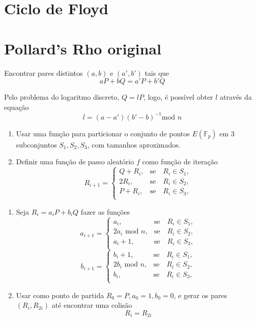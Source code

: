 \documentclass{beamer}
\newcounter{saveenumi}
\newcommand{\seti}{\setcounter{saveenumi}{\value{enumi}}}
\newcommand{\conti}{\setcounter{enumi}{\value{saveenumi}}}
\begin{document}
\section{Ciclo de Floyd}
\begin{frame}

\end{frame}

%
%
\section{Pollard's Rho original}
\begin{frame}
Encontrar pares distintos $(a,b)$ e $(a',b')$ tais que
$$aP + bQ = a'P + b'Q$$

Pelo problema do logaritmo discreto, $Q = lP$, logo, é possível obter $l$ através da equação
$$l = (a - a')(b' - b)^{-1} \mbox{mod }n$$
\end{frame}

\begin{frame}
\begin{enumerate}
\item Usar uma função para particionar o conjunto de pontos $E(\mathbb{F}_p)$ em 3 subconjuntos $S_1, S_2, S_3$, com tamanhos aproximados.
\item Definir uma função de passo aleatório $f$ como função de iteração
$$
R_{i+1}=\left\{\begin{array}{rc}
Q + R_i,&\mbox{se}\quad R_i \in S_1,\\
2R_i,&\mbox{se}\quad R_i \in S_2,\\
P + R_i,&\mbox{se}\quad R_i \in S_3,\\
\end{array}\right.
$$ 
\seti
\end{enumerate}
\end{frame}

\begin{frame}
  \begin{enumerate}
    \conti
    \item Seja $R_i = a_iP + b_iQ$ fazer as funções
      $$
        a_{i+1}=\left\{\begin{array}{rc}
        a_i,&\mbox{se}\quad R_i \in S_1,\\
        2a_i \mbox{ mod }n,&\mbox{se}\quad R_i \in S_2,\\
        a_i + 1,&\mbox{se}\quad R_i \in S_3,\\
        \end{array}\right.
      $$
      $$
        b_{i+1}=\left\{\begin{array}{rc}
        b_i + 1,&\mbox{se}\quad R_i \in S_1,\\
        2b_i \mbox{ mod }n,&\mbox{se}\quad R_i \in S_2,\\
        b_i,&\mbox{se}\quad R_i \in S_3,\\
        \end{array}\right.
      $$
    \item Usar como ponto de partida $R_0 = P, a_0 = 1, b_0 = 0$, e gerar os pares $(R_i, R_{2i})$ até encontrar uma colisão
      $$ R_i = R_{2i} $$
    \conti
  \end{enumerate}
\end{frame}
\end{document}
